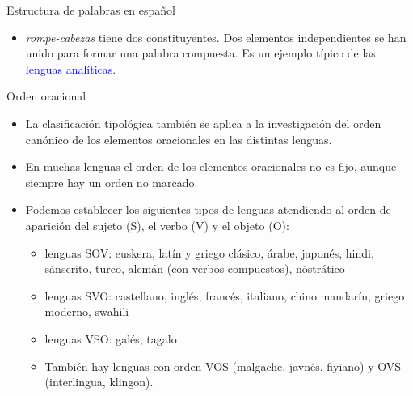 \documentclass[handout]{beamer}
\begin{document}
\begin{frame}{Estructura de palabras en español}

\begin{itemize}
	\item \textit{rompe-cabezas} tiene dos constituyentes. Dos elementos independientes se han unido para formar una palabra compuesta. Es un ejemplo típico de las \textcolor{blue}{lenguas analíticas}.

\end{itemize}
\end{frame}

\begin{frame}{Orden oracional}

\begin{itemize}
	\item La clasificación tipológica también se aplica a la investigación del orden canónico de los elementos oracionales en las distintas lenguas.
	\item En muchas lenguas el orden de los elementos oracionales no es fijo, aunque siempre hay un orden no marcado.
	\item Podemos establecer los siguientes tipos de lenguas atendiendo al orden de aparición del sujeto (S), el verbo (V) y el objeto (O):
	\begin{itemize}
		\item  lenguas SOV: euskera, latín y griego clásico, árabe, japonés, hindi, sánscrito, turco, alemán (con verbos compuestos), nóstrático
		\item lenguas SVO: castellano, inglés, francés, italiano, chino mandarín, griego moderno, swahili
		\item lenguas VSO: galés, tagalo 
		\item También hay lenguas con orden VOS (malgache, javnés, fiyiano) y OVS (interlingua, klingon).
	\end{itemize}
\end{itemize}
\end{frame}
\end{document}
